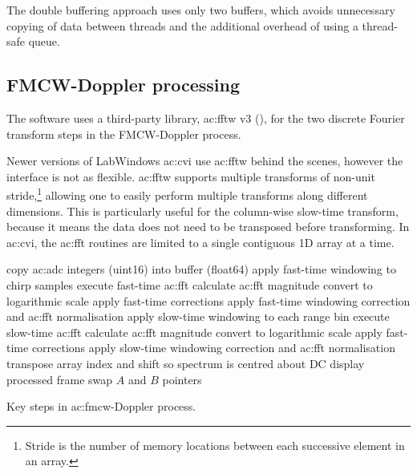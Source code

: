 \documentclass{article}
\begin{document}
The double buffering approach uses only two buffers, which avoids unnecessary copying of data between threads and the additional overhead of using a thread-safe queue.

\subsection{FMCW-Doppler processing}
The software uses a third-party library, \acrshort{ac:fftw} v3 (\cite{FFTWv3}), for the two discrete Fourier transform steps in the FMCW-Doppler process.

Newer versions of LabWindows \acrshort{ac:cvi} use \acrshort{ac:fftw} behind the scenes, however the interface is not as flexible. \acrshort{ac:fftw} supports multiple transforms of non-unit stride,\footnote{Stride is the number of memory locations between each successive element in an array.} allowing one to easily perform multiple transforms along different dimensions. This is particularly useful for the column-wise slow-time transform, because it means the data does not need to be transposed before transforming. In \acrshort{ac:cvi}, the \acrshort{ac:fft} routines are limited to a single contiguous 1D array at a time.

\begin{algorithm}
	\centering
	\begin{algorithmic}
		\State copy \acrshort{ac:adc} integers (uint16) into buffer (float64)
		\State apply fast-time windowing to chirp samples
		\EndFor
		\State execute fast-time \acrshort{ac:fft}
		\State calculate \acrshort{ac:fft} magnitude
		\State convert to logarithmic scale
		\State apply fast-time corrections
		\State apply fast-time windowing correction and \acrshort{ac:fft} normalisation
		\EndFor
		\EndFor
		\State apply slow-time windowing to each range bin
		\EndFor
		\State execute slow-time \acrshort{ac:fft}
		\State calculate \acrshort{ac:fft} magnitude
		\State convert to logarithmic scale
		\State apply fast-time corrections
		\State apply slow-time windowing correction and \acrshort{ac:fft} normalisation
		\State transpose array index and shift so spectrum is centred about DC
		\EndFor
		\EndFor
		\State display processed frame
		\State swap $A$ and $B$ pointers
		\EndFor
	\end{algorithmic}
	\caption{Key steps in \acrshort{ac:fmcw}-Doppler process.}\label{alg:FMCWProc}
\end{algorithm}
\end{document}
